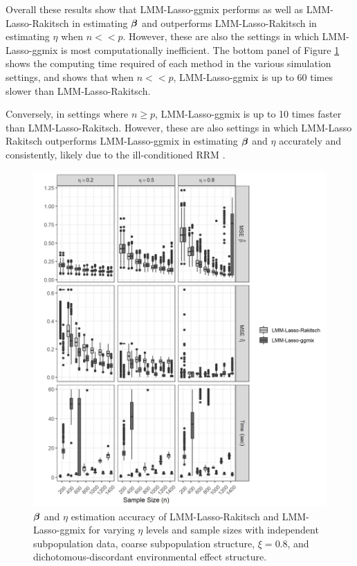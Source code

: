 Overall these results show that LMM-Lasso-ggmix performs as well as LMM-Lasso-Rakitsch in estimating $\boldsymbol{\beta}{}$ and outperforms LMM-Lasso-Rakitsch in estimating $\eta$ when $n << p$. However, these are also the settings in which LMM-Lasso-ggmix is most computationally inefficient. The bottom panel of Figure \ref{fig:eta_beta_mse} shows the computing time required of each method in the various simulation settings, and shows that when $n << p$, LMM-Lasso-ggmix is up to 60 times slower than LMM-Lasso-Rakitsch.

Conversely, in settings where $n \ge p$, LMM-Lasso-ggmix is up to 10 times faster than LMM-Lasso-Rakitsch. However, these are also settings in which LMM-Lasso Rakitsch outperforms LMM-Lasso-ggmix in estimating $\boldsymbol{\beta}{}$ and $\eta$ accurately and consistently, likely due to the ill-conditioned RRM \citep{ledoit2004well}.



\begin{figure}[H]
    \centering
    \includegraphics[scale = 1]{figures/eta_beta_hat.png}
     \caption{$\boldsymbol{\beta}{}$ and $\eta$ estimation accuracy of LMM-Lasso-Rakitsch and LMM-Lasso-ggmix for varying $\eta$ levels and sample sizes with independent subpopulation data, coarse subpopulation structure, $\xi = 0.8$, and dichotomous-discordant environmental effect structure.}
    \label{fig:eta_beta_mse}
\end{figure}

